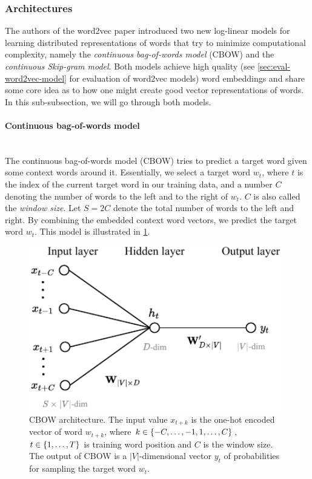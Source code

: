 \subsubsection{Architectures}
The authors of the word2vec paper introduced two new log-linear models for learning distributed representations of words that try to minimize computational complexity, namely the \textit{continuous bag-of-words model} (CBOW) and the \textit{continuous Skip-gram model}. Both models achieve high quality (see \cref{sec:eval-word2vec-model} for evaluation of word2vec models) word embeddings and share some core idea as to how one might create good vector representations of words. In this sub-subsection, we will go through both models.

\paragraph*{Continuous bag-of-words model}\mbox{} \\
The continuous bag-of-words model (CBOW) tries to predict a target word given some context words around it. Essentially, we select a target word $w_t$, where $t$ is the index of the current target word in our training data, and a number $C$ denoting the number of words to the left and to the right of $w_t$. $C$ is also called the \textit{window size}. Let $S=2C$ denote the total number of words to the left and right. By combining the embedded context word vectors, we predict the target word $w_t$. This model is illustrated in \cref{fig:cbow-model}.

\begin{figure}[H]
    \centering
    \includegraphics[width=11cm]{thesis/figures/cbow_cropped.pdf}
    \caption{CBOW architecture. The input value $x_{t+k}$ is the one-hot encoded vector of word $w_{t+k}$, where $k \in \left\{-C, \ldots, -1, 1, \ldots, C\right\}$, $t \in \left\{1, \ldots, T\right\}$ is training word position and $C$ is the window size. The output of CBOW is a $|V|$-dimensional vector $y_t$ of probabilities for sampling the target word $w_t$.}
    \label{fig:cbow-model}
\end{figure}

